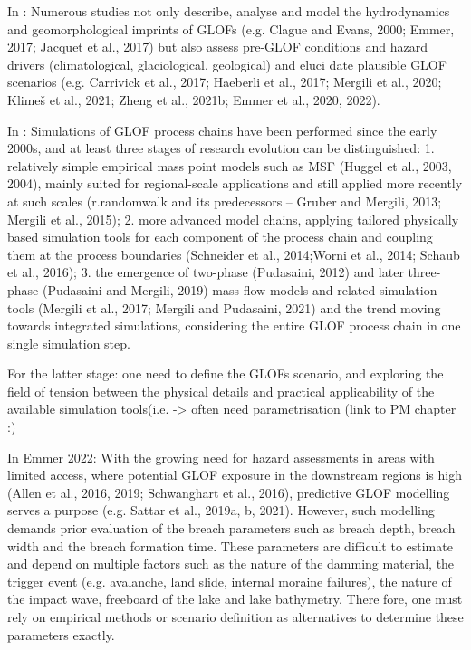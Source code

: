 In \cite{Emmer&al2022}: Numerous studies not only describe, analyse and model the hydrodynamics and geomorphological imprints of GLOFs (e.g. Clague and Evans, 2000; Emmer, 2017; Jacquet et al., 2017) but also assess pre-GLOF conditions and hazard drivers (climatological, glaciological, geological) and eluci date plausible GLOF scenarios (e.g. Carrivick et al., 2017; Haeberli et al., 2017; Mergili et al., 2020; Klimeš et al., 2021; Zheng et al., 2021b; Emmer et al., 2020, 2022).

In \cite{Emmer&al2022}: Simulations of GLOF process chains have been performed since the early 2000s, and at least three stages of research evolution can be distinguished:
1. relatively simple empirical mass point models such as MSF (Huggel et al., 2003, 2004), mainly suited for regional-scale applications and still applied more recently at such scales (r.randomwalk and its predecessors – Gruber and Mergili, 2013; Mergili et al., 2015);
2. more advanced model chains, applying tailored physically based simulation tools for each component of the process chain and coupling them at the process boundaries (Schneider et al., 2014;Worni et al., 2014; Schaub et al., 2016);
3. the emergence of two-phase (Pudasaini, 2012) and later three-phase (Pudasaini and Mergili, 2019) mass flow models and related simulation tools (Mergili et al., 2017; Mergili and Pudasaini, 2021) and the trend moving towards integrated simulations, considering the entire GLOF process chain in one single simulation step.

For the latter stage: one need to define the GLOFs scenario, and exploring the field of tension between the physical details and practical applicability of the available simulation tools(i.e. -> often need parametrisation (link to PM chapter :)



In Emmer 2022: With the growing need for hazard assessments in areas with limited access, where potential GLOF exposure in the downstream regions is high (Allen et al., 2016, 2019; Schwanghart et al., 2016), predictive GLOF modelling serves a purpose (e.g. Sattar et al., 2019a, b, 2021). However, such modelling demands prior evaluation of the breach parameters such as breach depth, breach width and the breach formation time. These parameters are difficult to estimate and depend on multiple factors such as the nature of the
damming material, the trigger event (e.g. avalanche, land slide, internal moraine failures), the nature of the impact wave, freeboard of the lake and lake bathymetry. There fore, one must rely on empirical methods or scenario definition as alternatives to determine these parameters exactly.

